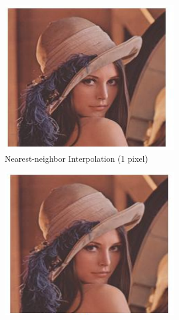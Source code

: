 \begin{figure}[H]
\hspace*{\fill} %
\begin{subfigure}{0.31\textwidth}
\includegraphics[width=\linewidth]{img/interp_nn.pdf}
\caption{Nearest-neighbor Interpolation (1 pixel)} \label{fig:1a}
\end{subfigure}
\hspace*{\fill} %
\begin{subfigure}{0.31\textwidth}
\includegraphics[width=\linewidth]{img/interp_bili.pdf}

\end{subfigure}
\end{figure}
